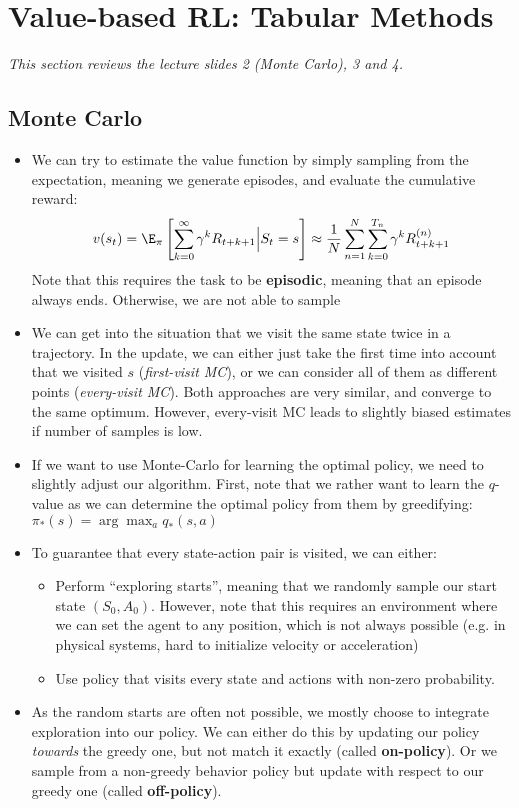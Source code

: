 \section{Value-based RL: Tabular Methods}
\textit{This section reviews the lecture slides 2 (Monte Carlo), 3 and 4.}
\subsection{Monte Carlo}
\begin{itemize}
	\item We can try to estimate the value function by simply sampling from the expectation, meaning we generate episodes, and evaluate the cumulative reward:
	$$v(s_t)=\E_{\pi}\left[\sum_{k=0}^{\infty} \gamma^k R_{t+k+1}\Big\vert S_t=s\right]\approx \frac{1}{N}\sum_{n=1}^{N}\sum_{k=0}^{T_{n}}\gamma^k R_{t+k+1}^{(n)}$$
	Note that this requires the task to be \textbf{episodic}, meaning that an episode always ends. Otherwise, we are not able to sample 
	\item We can get into the situation that we visit the same state twice in a trajectory. In the update, we can either just take the first time into account that we visited $s$ (\textit{first-visit MC}), or we can consider all of them as different points (\textit{every-visit MC}). Both approaches are very similar, and converge to the same optimum. However, every-visit MC leads to slightly biased estimates if number of samples is low.
	\item If we want to use Monte-Carlo for learning the optimal policy, we need to slightly adjust our algorithm. First, note that we rather want to learn the $q$-value as we can determine the optimal policy from them by greedifying: $\pi_{*}(s)=\arg\max_a q_{*}(s,a)$
	\item To guarantee that every state-action pair is visited, we can either:
	\begin{itemize}
		\item Perform ``exploring starts'', meaning that we randomly sample our start state $(S_0,A_0)$. However, note that this requires an environment where we can set the agent to any position, which is not always possible (e.g. in physical systems, hard to initialize velocity or acceleration)
		\item Use policy that visits every state and actions with non-zero probability. 
	\end{itemize}
	\item As the random starts are often not possible, we mostly choose to integrate exploration into our policy. We can either do this by updating our policy \textit{towards} the greedy one, but not match it exactly (called \textbf{on-policy}). Or we sample from a non-greedy behavior policy but update with respect to our greedy one (called \textbf{off-policy}).
\end{itemize}
